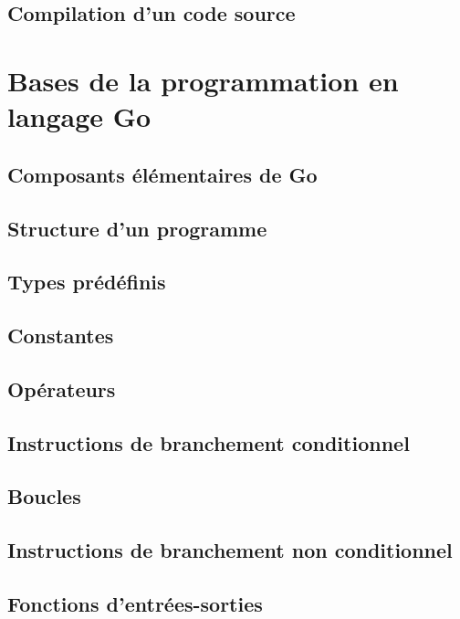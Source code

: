 \documentclass[11pt]{article}
\begin{document}
\subsection{Compilation d'un code source}


\section{Bases de la programmation en langage Go}

\subsection{Composants élémentaires de Go}

\subsection{Structure d'un programme}

\subsection{Types prédéfinis}

\subsection{Constantes}

\subsection{Opérateurs}

\subsection{Instructions de branchement conditionnel}

\subsection{Boucles}

\subsection{Instructions de branchement non conditionnel}

\subsection{Fonctions d'entrées-sorties}
\end{document}
